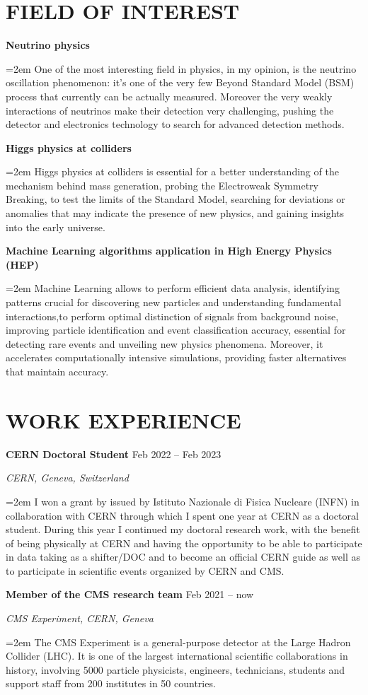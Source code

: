 \documentclass[paper=a4,fontsize=12pt]{article} %
\newcommand{\sepspace}{\vspace*{1em}}		%
\newcommand{\sepspacesmall}{\vspace*{0.3em}}
\newcommand{\NewPart}[1]{\section*{\uppercase{#1}}}
\newcommand{\EducationEntry}[4]{
	\noindent \textbf{#1} \hfill      %
	{#2} \par  %
	\noindent \textit{#3} \par        %
	\noindent\hangindent=2em\hangafter=0 \small #4 %
	\normalsize \par}
\begin{document}
    
    \sepspace
    \NewPart{Field of interest}
    \EducationEntry{Neutrino physics}{}{}{One of the most interesting field in physics, in my opinion, is the neutrino oscillation phenomenon: it's one of the very few Beyond Standard Model (BSM) process that currently can be actually measured. Moreover the very weakly interactions of neutrinos make their detection very challenging, pushing the detector and electronics technology to search for advanced detection methods.}
    \sepspacesmall 
	\EducationEntry{Higgs physics at colliders}{}{}{Higgs physics at colliders is essential for a better understanding of the mechanism behind mass generation, probing the Electroweak Symmetry Breaking, to test the limits of the Standard Model, searching for deviations or anomalies that may indicate the presence of new physics, and gaining insights into the early universe.}
	\sepspacesmall 
	\EducationEntry{Machine Learning algorithms application in High Energy Physics (HEP)}{}{}{Machine Learning allows to perform efficient data analysis, identifying patterns crucial for discovering new particles and understanding fundamental interactions,to perform optimal distinction of signals from background noise, improving particle identification and event classification accuracy, essential for detecting rare events and unveiling new physics phenomena. Moreover, it accelerates computationally intensive simulations, providing faster alternatives that maintain accuracy.}
	\sepspacesmall 
    \NewPart{Work Experience}
	\EducationEntry{CERN Doctoral Student}{Feb 2022 -- Feb 2023}{CERN, Geneva, Switzerland}{I won a grant by  issued by Istituto Nazionale di Fisica Nucleare (INFN) in collaboration with CERN through which I spent one year at CERN as a doctoral student. During this year I continued my doctoral research work, with the benefit of being physically at CERN and having the opportunity to be able to participate in data taking as a shifter/DOC and to become an official CERN guide as well as to participate in scientific events organized by CERN and CMS.}
	\sepspace     
	\EducationEntry{Member of the CMS research team}{Feb 2021 -- now}{CMS Experiment, CERN, Geneva}{The CMS Experiment is a general-purpose detector at the Large Hadron Collider (LHC). It is one of the largest international scientific collaborations in history, involving 5000 particle physicists, engineers, technicians, students and support staff from 200 institutes in 50 countries.}
\end{document}
